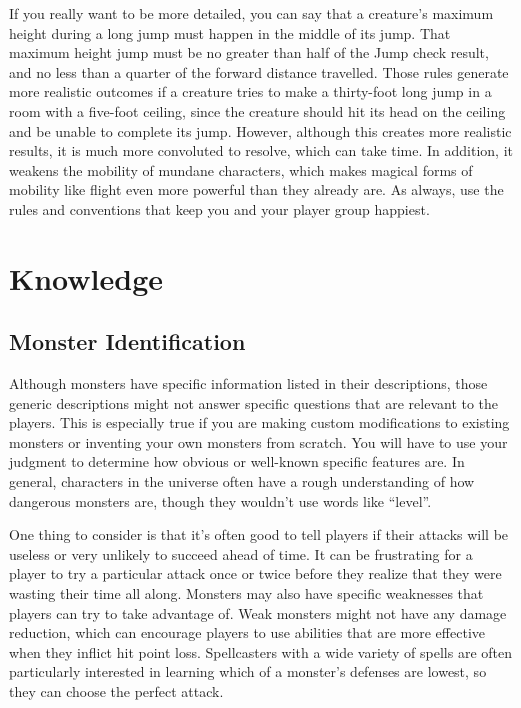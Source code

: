         If you really want to be more detailed, you can say that a creature's maximum height during a long jump must happen in the middle of its jump.
        That maximum height jump must be no greater than half of the Jump check result, and no less than a quarter of the forward distance travelled.
        Those rules generate more realistic outcomes if a creature tries to make a thirty-foot long jump in a room with a five-foot ceiling, since the creature should hit its head on the ceiling and be unable to complete its jump.
        However, although this creates more realistic results, it is much more convoluted to resolve, which can take time.
        In addition, it weakens the mobility of mundane characters, which makes magical forms of mobility like flight even more powerful than they already are.
        As always, use the rules and conventions that keep you and your player group happiest.

\section{Knowledge}\label{Knowledge}
    
    \subsection{Monster Identification}
        Although monsters have specific information listed in their descriptions, those generic descriptions might not answer specific questions that are relevant to the players.
        This is especially true if you are making custom modifications to existing monsters or inventing your own monsters from scratch.
        You will have to use your judgment to determine how obvious or well-known specific features are.
        In general, characters in the universe often have a rough understanding of how dangerous monsters are, though they wouldn't use words like ``level''.

        One thing to consider is that it's often good to tell players if their attacks will be useless or very unlikely to succeed ahead of time.
        It can be frustrating for a player to try a particular attack once or twice before they realize that they were wasting their time all along.
        Monsters may also have specific weaknesses that players can try to take advantage of.
        Weak monsters might not have any damage reduction, which can encourage players to use abilities that are more effective when they inflict hit point loss.
        Spellcasters with a wide variety of spells are often particularly interested in learning which of a monster's defenses are lowest, so they can choose the perfect attack.

